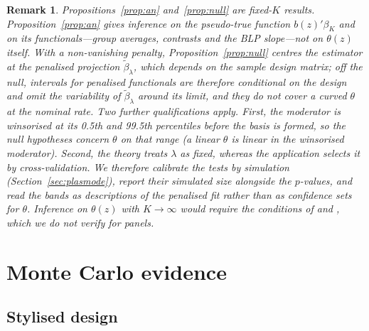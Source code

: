 \documentclass[pdflatex,sn-basic]{sn-jnl}%
\theoremstyle{thmstyleone}
\theoremstyle{thmstyletwo}
\newtheorem{remark}{Remark}
\begin{document}
\begin{remark}\label{rem:scope}
Propositions~\ref{prop:an} and~\ref{prop:null} are fixed-$K$ results. Proposition~\ref{prop:an} gives inference on the pseudo-true function $b(z)'\beta_K$ and on its functionals---group averages, contrasts and the BLP slope---not on $\theta(z)$ itself. With a non-vanishing penalty, Proposition~\ref{prop:null} centres the estimator at the penalised projection $\tilde\beta_\lambda$, which depends on the sample design matrix; off the null, intervals for penalised functionals are therefore conditional on the design and omit the variability of $\tilde\beta_\lambda$ around its limit, and they do not cover a curved $\theta$ at the nominal rate. Two further qualifications apply. First, the moderator is winsorised at its 0.5th and 99.5th percentiles before the basis is formed, so the null hypotheses concern $\theta$ on that range (a linear $\theta$ is linear in the winsorised moderator). Second, the theory treats $\lambda$ as fixed, whereas the application selects it by cross-validation. We therefore calibrate the tests by simulation (Section~\ref{sec:plasmode}), report their simulated size alongside the $p$-values, and read the bands as descriptions of the penalised fit rather than as confidence sets for $\theta$. Inference on $\theta(z)$ with $K\to\infty$ would require the conditions of \citet{belloni2015series} and \citet{semenova2021cate}, which we do not verify for panels.
\end{remark}

\section{Monte Carlo evidence}\label{sec:sim}

\subsection{Stylised design}
\end{document}
